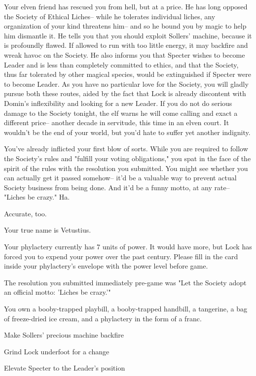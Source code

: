 \documentclass[char]{Sel}
\begin{document}
Your elven friend has rescued you from hell, but at a price. He has long opposed the Society of Ethical Liches-- while he tolerates individual liches, any organization of your kind threatens him-- and so he bound you by magic to help him dismantle it. He tells you that you should exploit Sollers' machine, because it is profoundly flawed. If allowed to run with too little energy, it may backfire and wreak havoc on the Society. He also informs you that Specter wishes to become Leader and is less than completely committed to ethics, and that the Society, thus far tolerated by other magical species, would be extinguished if Specter were to become Leader. As you have no particular love for the Society, you will gladly pursue both these routes, aided by the fact that Lock is already discontent with Domin's inflexibility and looking for a new Leader. If you do not do serious damage to the Society tonight, the elf warns he will come calling and exact a different price-- another decade in servitude, this time in an elven court. It wouldn't be the end of your world, but you'd hate to suffer yet another indignity.

You've already inflicted your first blow of sorts. While you are required to follow the Society's rules and "fulfill your voting obligations," you spat in the face of the spirit of the rules with the resolution you submitted. You might see whether you can actually get it passed somehow-- it'd be a valuable way to prevent actual Society business from being done. And it'd be a funny motto, at any rate-- "Liches be crazy." Ha.

Accurate, too.

\begin{itemz}[Notes]
  \item Your true name is Vetustius.
      \item Your phylactery currently has 7 units of power. It would have more, but Lock has forced you to expend your power over the past century. Please fill in the card inside your phylactery's envelope with the power level before game.
  \item The resolution you submitted immediately pre-game was "Let the Society adopt an official motto: 'Liches be crazy.'"
  \item You own a booby-trapped playbill, a booby-trapped handbill, a tangerine, a bag of freeze-dried ice cream, and a phylactery in the form of a franc.
    \end{itemz}
    
  
  
 \begin{itemz}[Goals]
\item Make Sollers' precious machine backfire
\item Grind Lock underfoot for a change
\item Elevate Specter to the Leader's position
\end{itemz}
\end{document}
